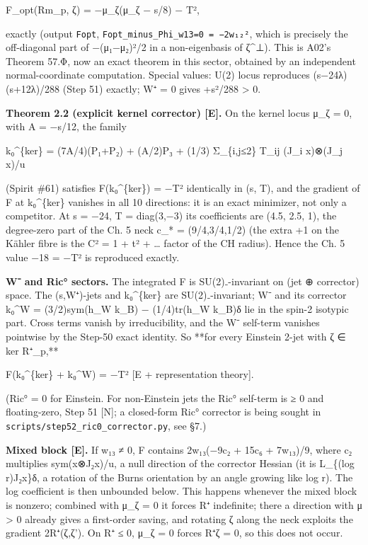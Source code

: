 \documentclass[
  10pt,
]{report}
\begin{document}
F\_opt(Rm\_p, ζ) = −μ\_ζ(μ\_ζ − s/8) − \textbar T\textbar²,

exactly (output \texttt{Fopt},
\texttt{Fopt\_minus\_Phi\_w13=0\ =\ −2w₁₂²}, which is precisely the
off-diagonal part of −(μ₁−μ₂)²/2 in a non-eigenbasis of ζ\^{}⊥). This is
A02's Theorem 57.Φ, now an exact theorem in this sector, obtained by an
independent normal-coordinate computation. Special values: U(2) locus
reproduces (s−24λ)(s+12λ)/288 (Step 51) exactly; W⁺ = 0 gives +s²/288
\textgreater{} 0.

\textbf{Theorem 2.2 (explicit kernel corrector) {[}E{]}.} On the kernel
locus μ\_ζ = 0, with A = −s/12, the family

k₀\^{}\{ker\} = (7A/4)(P₁+P₂) + (A/2)P₃ + (1/3) Σ\_\{i,j≤2\} T\_ij (J\_i
x)⊗(J\_j x)/u

(Spirit \#61) satisfies F(k₀\^{}\{ker\}) = −\textbar T\textbar²
identically in (s, T), and the gradient of F at k₀\^{}\{ker\} vanishes
in all 10 directions: it is an exact minimizer, not only a competitor.
At s = −24, T = diag(3,−3) its coefficients are (4.5, 2.5, 1), the
degree-zero part of the Ch. 5 neck c\_* = (9/4,3/4,1/2) (the extra +1 on
the Kähler fibre is the C² = 1 + t² + \ldots{} factor of the CH radius).
Hence the Ch. 5 value −18 = −\textbar T\textbar² is reproduced exactly.

\textbf{W⁻ and Ric° sectors.} The integrated F is SU(2)₋-invariant on
(jet ⊕ corrector) space. The (s,W⁺)-jets and k₀\^{}\{ker\} are
SU(2)₋-invariant; W⁻ and its corrector k₀\^{}W = (3/2)sym(h\_W k\_B) −
(1/4)tr(h\_W k\_B)δ lie in the spin-2 isotypic part. Cross terms vanish
by irreducibility, and the W⁻ self-term vanishes pointwise by the
Step-50 exact identity. So **for every Einstein 2-jet with ζ ∈ ker
R⁺\_p,**

F(k₀\^{}\{ker\} + k₀\^{}W) = −\textbar T\textbar² {[}E + representation
theory{]}.

(Ric° = 0 for Einstein. For non-Einstein jets the Ric° self-term is ≥ 0
and floating-zero, Step 51 {[}N{]}; a closed-form Ric° corrector is
being sought in \texttt{scripts/step52\_ric0\_corrector.py}, see §7.)

\textbf{Mixed block {[}E{]}.} If w₁₃ ≠ 0, F contains 2w₁₃(−9c₂ + 15c₆ +
7w₁₃)/9, where c₂ multiplies sym(x⊗J₂x)/u, a null direction of the
corrector Hessian (it is L\_\{(log r)J₂x\}δ, a rotation of the Burns
orientation by an angle growing like log r). The log coefficient is then
unbounded below. This happens whenever the mixed block is nonzero;
combined with μ\_ζ = 0 it forces R⁺ indefinite; there a direction with μ
\textgreater{} 0 already gives a first-order saving, and rotating ζ
along the neck exploits the gradient 2R⁺(ζ,ζ'). On R⁺ ≤ 0, μ\_ζ = 0
forces R⁺ζ = 0, so this does not occur.
\end{document}
